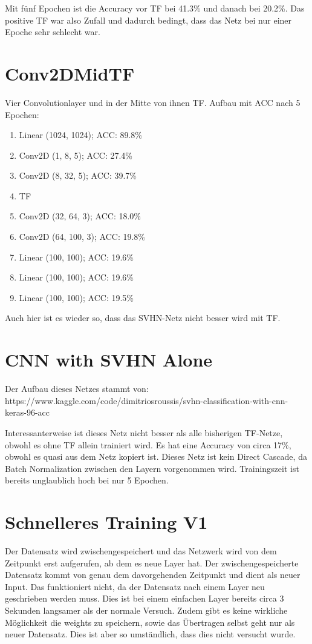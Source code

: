     Mit fünf Epochen ist die Accuracy vor TF bei 41.3\% und danach bei 20.2\%. 
    Das positive TF war also Zufall und dadurch bedingt, dass das Netz bei nur einer 
    Epoche sehr schlecht war.

\section{Conv2DMidTF}
    Vier Convolutionlayer und in der Mitte von ihnen TF.
    Aufbau mit ACC nach 5 Epochen: 
    \begin{enumerate}
        \item Linear (1024, 1024); ACC: 89.8\%
        \item Conv2D (1, 8, 5); ACC: 27.4\%
        \item Conv2D (8, 32, 5); ACC: 39.7\%
        \item TF
        \item Conv2D (32, 64, 3); ACC: 18.0\%
        \item Conv2D (64, 100, 3); ACC: 19.8\%
        \item Linear (100, 100); ACC: 19.6\%
        \item Linear (100, 100); ACC: 19.6\%
        \item Linear (100, 100); ACC: 19.5\%
    \end{enumerate}
    Auch hier ist es wieder so, dass das SVHN-Netz nicht besser wird mit TF.

\section{CNN with SVHN Alone}
    Der Aufbau dieses Netzes stammt von: https://www.kaggle.com/code/dimitriosroussis/svhn-classification-with-cnn-keras-96-acc
    
    Interessanterweise ist dieses Netz nicht besser als alle bisherigen TF-Netze, obwohl es ohne TF allein 
    trainiert wird. Es hat eine Accuracy von circa 17\%, obwohl es quasi aus dem Netz kopiert ist. Dieses Netz ist 
    kein Direct Cascade, da Batch Normalization zwischen 
    den Layern vorgenommen wird. Trainingszeit ist bereits unglaublich hoch bei nur 5 Epochen.

\section{Schnelleres Training V1}
    Der Datensatz wird zwischengespeichert und das Netzwerk wird von dem Zeitpunkt 
    erst aufgerufen, ab dem es neue Layer hat. Der zwischengespeicherte Datensatz kommt 
    von genau dem davorgehenden Zeitpunkt und dient als neuer Input. Das funktioniert nicht, 
    da der Datensatz nach einem Layer neu geschrieben werden muss. Dies ist bei einem 
    einfachen Layer bereits circa 3 Sekunden langsamer als der normale Versuch. Zudem gibt 
    es keine wirkliche Möglichkeit die weights zu speichern, sowie das Übertragen selbst 
    geht nur als neuer Datensatz. Dies ist aber so umständlich, dass dies nicht versucht 
    wurde. 

